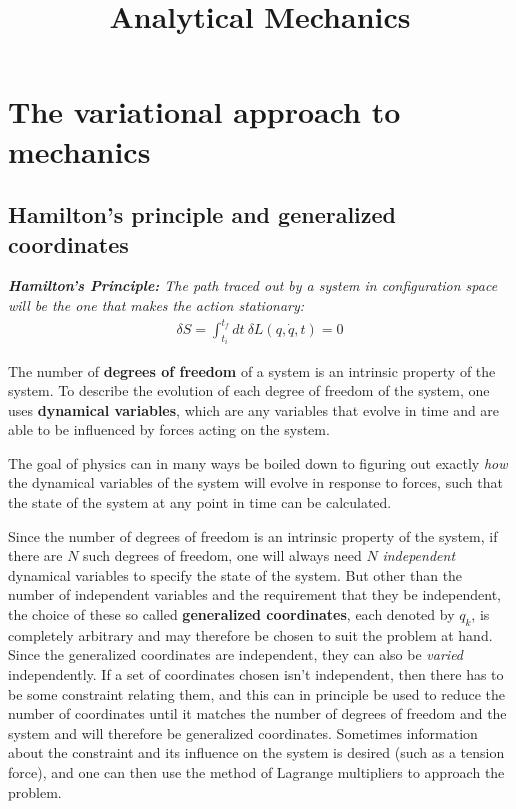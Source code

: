 \documentclass[a4paper]{article}
\title{Analytical Mechanics}
\begin{document}
    \maketitle
    \tableofcontents
    \newpage
    
    \section{The variational approach to mechanics}
    \subsection{Hamilton's principle and generalized coordinates}
    \textit{\textbf{Hamilton's Principle:} The path traced out by a system in configuration space will be the one that makes the action stationary: \begin{align*}
        \boxed{\delta S = \int_{t_i}^{t_f}dt\ \delta L(q, \dot{q}, t) = 0}
    \end{align*}}

    The number of \textbf{degrees of freedom} of a system is an intrinsic property of the system. To describe the evolution of each degree of freedom of the system, one uses \textbf{dynamical variables}, which are any variables that evolve in time and are able to be influenced by forces acting on the system. 
    
    The goal of physics can in many ways be boiled down to figuring out exactly \textit{how} the dynamical variables of the system will evolve in response to forces, such that the state of the system at any point in time can be calculated. 
    
    Since the number of degrees of freedom is an intrinsic property of the system, if there are \(N\) such degrees of freedom, one will always need \(N\) \textit{independent} dynamical variables to specify the state of the system. But other than the number of independent variables and the requirement that they be independent, the choice of these so called \textbf{generalized coordinates}, each denoted by \(q_k\), is completely arbitrary and may therefore be chosen to suit the problem at hand. Since the generalized coordinates are independent, they can also be \textit{varied} independently. If a set of coordinates chosen isn't independent, then there has to be some constraint relating them, and this can in principle be used to reduce the number of coordinates until it matches the number of degrees of freedom and the system and will therefore be generalized coordinates. Sometimes information about the constraint and its influence on the system is desired (such as a tension force), and one can then use the method of Lagrange multipliers to approach the problem. 
    
\end{document}
